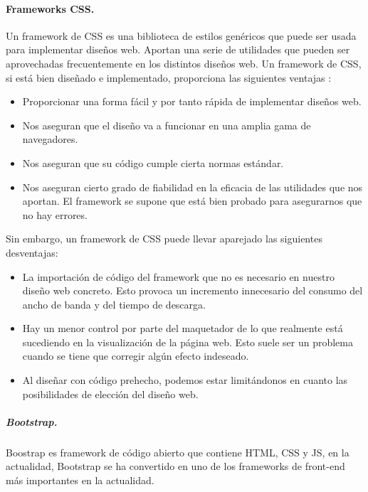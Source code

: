 \documentclass[12pt, a4paper, titlepage]{report}
\begin{document}
			\paragraph{Frameworks CSS.\\}
			Un framework de CSS es una biblioteca de estilos genéricos que puede ser usada para implementar diseños web. Aportan una serie de utilidades que pueden ser aprovechadas frecuentemente en los distintos diseños web.
			Un framework de CSS, si está bien diseñado e implementado, proporciona las siguientes ventajas \cite{refMaterialize}:
            \begin{itemize}
                \item Proporcionar una forma fácil y por tanto rápida de implementar diseños web.
                \item Nos aseguran que el diseño va a funcionar en una amplia gama de navegadores.
                \item Nos aseguran que su código cumple cierta normas estándar.
                \item  Nos aseguran cierto grado de fiabilidad en la eficacia de las utilidades que nos aportan. El framework se supone que está bien probado para asegurarnos que no hay errores.
            \end{itemize}
            Sin embargo, un framework de CSS puede llevar aparejado las siguientes desventajas\cite{refMaterialize}:
            \begin{itemize}
                \item La importación de código del framework que no es necesario en nuestro diseño web concreto. Esto provoca un incremento innecesario del consumo del ancho de banda y del tiempo de descarga.
                \item Hay un menor control por parte del maquetador de lo que realmente está sucediendo en la visualización de la página web. Esto suele ser un problema cuando se tiene que corregir algún efecto indeseado.
                \item Al diseñar con código prehecho, podemos estar limitándonos en cuanto las posibilidades de elección del diseño web.
            \end{itemize}
            
            \subparagraph{Bootstrap.\\}
			Boostrap es framework de código abierto que contiene HTML, CSS y JS, en la actualidad, Bootstrap se ha convertido en uno de los frameworks de front-end más importantes en la actualidad.
			\cite{refBootstrap}
			
\end{document}
